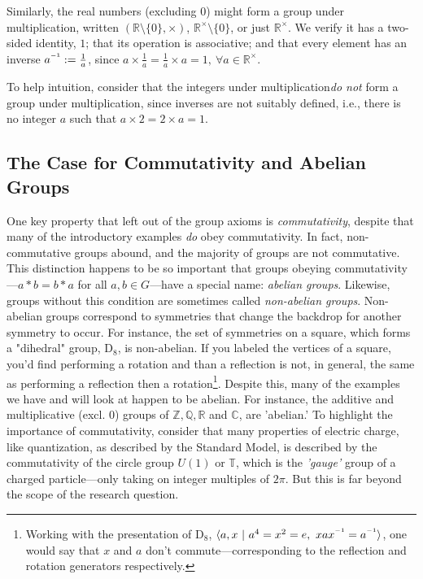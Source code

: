 \documentclass[11pt, a4paper]{report}
\newcommand{\inv}{^{\raisebox{.2em}{$\scriptscriptstyle-1$}}}
\newcommand{\integers}{\mathbb{Z}}
\newcommand{\rationals}{\mathbb{Q}}
\newcommand{\reals}{\mathbb{R}}
\newcommand{\complexes}{\mathbb{C}}
\begin{document}
 Similarly, the real numbers (excluding 0) might form a group under multiplication, written $(\reals\setminus\lbrace 0 \rbrace, \times)$, $\reals^{\times}\setminus\lbrace 0 \rbrace$, or just $\reals^{\times}$. 
We verify it has a two-sided identity, $1$; that its operation is associative; and that every element has an inverse $a\inv := \frac{1}{a}$, since $a\times \frac{1}{a} = \frac{1}{a} \times a = 1, \ \forall  a \in  \reals^{\times}$. 
 
 To help intuition, consider that the integers under multiplication\textit{do not} form a group under multiplication, since inverses are not suitably defined, i.e., there is no integer $a$ such that $a\times 2 = 2 \times a = 1$.

\subsection{The Case for Commutativity and Abelian Groups}
One key property that left out of the group axioms is \textit{commutativity}, despite that many of the introductory examples \textit{do} obey commutativity. In fact, non-commutative groups abound, and the majority of groups are not commutative.\autocite{aschbacher} This distinction happens to be so important that groups obeying commutativity—$a \ast b = b \ast a$ for all $a,b \in G$—have a special name: \textit{abelian groups}.\autocite[17]{dummit} Likewise, groups without this condition are sometimes called \textit{non-abelian groups}. Non-abelian groups correspond to symmetries that change the backdrop for another symmetry to occur. For instance, the set of symmetries on a square, which forms a "dihedral" group, $\mathrm{D}_{8}$, is non-abelian. If you labeled the vertices of a square, you'd find performing a rotation and than a reflection is not, in general, the same as performing a reflection then a rotation\footnote{Working with the presentation of $\mathrm{D}_8$, $\langle a,x\ \vert \ a^4 = x^2 = e,\ xax\inv = a\inv \rangle$, one would say that $x$ and $a$ don't commute—corresponding to the reflection and rotation generators respectively.}. Despite this, many of the examples we have and will look at happen to be abelian. For instance, the additive and multiplicative (excl. $0$) groups of $\integers, \rationals, \reals$ and $\complexes$, are  'abelian.' To highlight the importance of commutativity, consider that many properties of electric charge, like quantization, as described by the Standard Model, is described by the commutativity of the circle group $U(1)$ or $\mathbb{T}$, which is the \textit{'gauge'} group of a charged particle—only taking on integer multiples of $2\pi$. \autocite{weinberg} But this is far beyond the scope of the research question.
\end{document}
